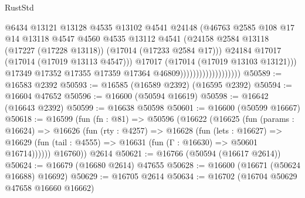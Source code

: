 \begin{lexlean}{RustStd}
\begin{coremodule}
{\begin{coremodule}
{{{{{{{{{{{{{{{{{{{{{{{{{{{{{{{{{{{{{{{{{{{{{{{{{{{{{{{                                            @6434
                                            @13121
                                            @13128
                                            @4535
                                            @13102
                                            @4541
                                            @24148
                                            (@46763
                                              @2585
                                              @108
                                              @17
                                              @14
                                              @13118
                                              @4547
                                              @4560
                                              @4535
                                              @13112
                                              @4541
                                              (@24158
                                                @2584
                                                @13118
                                                (@17227 (@17228 @13118))
                                                (@17014 (@17233 @2584 @17)))
                                              @24184
                                              @17017
                                              (@17014 (@17019 @13113 @4547)))
                                            @17017
                                            (@17014 (@17019 @13103 @13121)))
                                          @17349
                                          @17352
                                          @17355
                                          @17359
                                          @17364
                                          @46809)))))))))))))))))))
@50589 := @16583 @2392
@50593 := @16585 (@16589 @2392) (@16595 @2392)
@50594 := @16604 @47652
@50596 := @16600 (@50594 @16619)
@50598 := @16642 (@16643 @2392)
@50599 := @16638 @50598
@50601 := @16600 (@50599 @16667)
@50618 := @16599
    (fun (fn : @81) =>
    @50596
      (@16622
        (@16625
          (fun (params : @16624) =>
          @16626
            (fun (rty : @4257) =>
            @16628
              (fun (lets : @16627) =>
              @16629 (fun (tail : @4555) => @16631 (fun (Γ : @16630) => @50601 @16714))))))
        @16760))
    @2614
@50621 := @16766 (@50594 (@16617 @2614))
@50624 := @16679 (@16680 @2614) @47655
@50628 := @16600 (@16671 (@50624 @16688) @16692)
@50629 := @16705 @2614
@50634 := @16702 (@16704 @50629 @47658 @16660 @16662)
}}}}}}}}}}}}}}}}}}}}}}}}}}}}}}}}}}}}}}}}}}}}}}}}}}}}}}}
\end{coremodule}}
\end{coremodule}
\end{lexlean}
